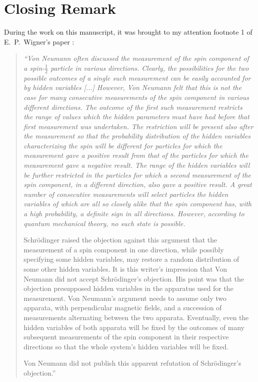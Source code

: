 \documentclass[12pt]{article}                    %
\begin{document}
\section{Closing Remark}

During the work on this manuscript, it was brought to my attention 
footnote 1 of E.~P.~Wigner's paper \cite{Wigner:1976ga}:
\begin{quote}
{\it ``Von Neumann often discussed the measurement of the spin component
of a spin-$\frac12$ particle in various directions. Clearly,
the possibilities for the two possible outcomes
of a single such measurement can be easily accounted for
by hidden variables [...] However, Von Neumann felt that this is
not the case for many consecutive measurements of the spin component
in various different directions. The outcome of the first such
measurement restricts the range of values which the hidden parameters
must have had before that first measurement was undertaken. The
restriction will be present also after the measurement so that the
probability distribution of the hidden variables characterizing the spin will
be different for particles for which the measurement gave a positive
result from that of the particles for which the measurement gave a
negative result. The range of the hidden variables will be
further restricted in the particles for which a second measurement
of the spin component, in a different direction, also gave a
positive result. A great number of consecutive measurements will
select particles the hidden variables of which are all so
closely alike that the spin component has, with a high probability,
a definite sign in all directions. However, according to quantum
mechanical theory, no such state is possible. 

Schr\"odinger
raised the objection against this argument that the measurement
of a spin component in one direction, while possibly specifying
some hidden variables, may restore a random distribution of some other
hidden variables. It is this writer's impression that Von Neumann did not
accept Schr\"odinger's objection. His point was that the objection
presupposed hidden variables in the apparatus used for the 
measurement. Von Neumann's argument needs to assume only two
apparata, with perpendicular magnetic fields, and a succession of
measurements alternating between the two apparata. Eventually, even
the hidden variables of both apparata will be fixed by the outcomes
of many subsequent measurements of the spin component in their respective
directions so that the whole system's hidden variables will be fixed.

Von Neumann did not publish this apparent refutation of Schr\"odinger's
objection.''}
\end{quote}
\end{document}
